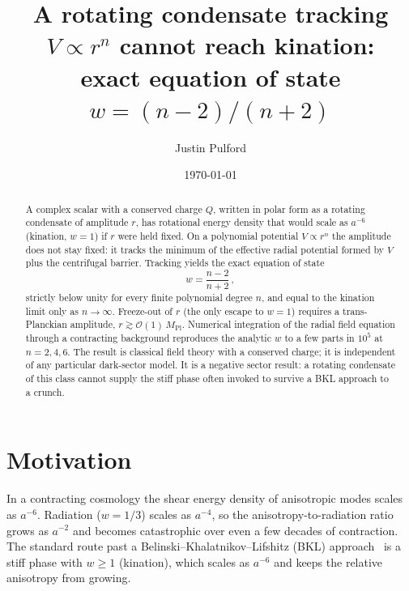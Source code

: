 \documentclass[aps,prd,twocolumn,superscriptaddress,nofootinbib,10pt]{revtex4-2}
\begin{document}
\title{A rotating condensate tracking $V\propto r^{n}$ cannot reach kination:\\
exact equation of state $w=(n-2)/(n+2)$}

\author{Justin Pulford}

\date{\today}

\begin{abstract}
A complex scalar with a conserved charge $Q$, written in polar form as a rotating condensate of
amplitude $r$, has rotational energy density that would scale as $a^{-6}$ (kination, $w=1$) if $r$
were held fixed. On a polynomial potential $V\propto r^{n}$ the amplitude does not stay fixed: it
tracks the minimum of the effective radial potential formed by $V$ plus the centrifugal barrier.
Tracking yields the exact equation of state
\begin{equation*}
  w = \frac{n-2}{n+2}\,,
\end{equation*}
strictly below unity for every finite polynomial degree $n$, and equal to the kination limit only
as $n\to\infty$. Freeze-out of $r$ (the only escape to $w=1$) requires a trans-Planckian amplitude,
$r\gtrsim\mathcal{O}(1)\,M_{\mathrm{Pl}}$. Numerical integration of the radial field equation through a
contracting background reproduces the analytic $w$ to a few parts in $10^{5}$ at $n=2,4,6$. The
result is classical field theory with a conserved charge; it is independent of any particular
dark-sector model. It is a negative sector result: a rotating condensate of this class cannot
supply the stiff phase often invoked to survive a BKL approach to a crunch.
\end{abstract}

\maketitle

\section{Motivation}\label{sec:motivation}

In a contracting cosmology the shear energy density of anisotropic modes scales as $a^{-6}$.
Radiation ($w=1/3$) scales as $a^{-4}$, so the anisotropy-to-radiation ratio grows as $a^{-2}$
and becomes catastrophic over even a few decades of contraction. The standard route past a
Belinski--Khalatnikov--Lifshitz (BKL) approach~\cite{BKL1970,BKL1982} is a stiff phase with
$w\geq 1$ (kination), which scales as $a^{-6}$ and keeps the relative anisotropy from growing.
\end{document}
